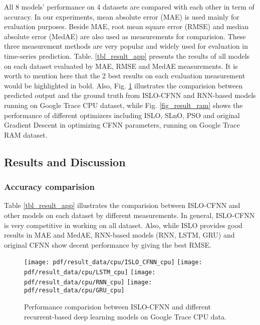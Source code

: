 \documentclass[../main.tex]{subfiles}
\begin{document}
	All 8 models' performance on 4 datasets are compared with each other in term of accuracy. In our experiments, mean absolute error (MAE) is used mainly for evaluation purposes. Beside MAE, root mean square error (RMSE) and median absolute error	(MedAE) are also used as measurements for comparision. These three measurement methods are very popular and widely used for evaluation in time-series prediction. Table. \ref{tbl_result_app} presents the results of all models on each dataset evaluated by MAE, RMSE and MedAE measurements. It is worth to mention here that the 2 best results on each evaluation measurement would be highlighted in bold. Also, Fig. \ref{fig_result_cpu_islo_rnn} illustrates the comparision between predicted output and the ground truth from ISLO-CFNN and RNN-based models running on Google Trace CPU dataset, while Fig. \ref{fig_result_ram} shows the performance of different optimizers including ISLO, SLnO, PSO and original Gradient Descent in optimizing CFNN parameters, running on Google Trace RAM dataset.



\subsection{Results and Discussion}  
\label{Results_app}
\subsubsection{Accuracy comparision}
	Table \ref{tbl_result_app} illustrates the comparision between ISLO-CFNN and other models on each dataset by different measurements. In general, ISLO-CFNN is very competitive in working on all dataset. Also, while ISLO provides good results in MAE and MedAE, RNN-based models (RNN, LSTM, GRU) and original CFNN show decent performance by giving the best RMSE.
	
\begin{figure}[!ht] 
   \centering
   	\texttt{[image: pdf/result\_data/cpu/ISLO\_CFNN\_cpu]}
  	 \texttt{[image: pdf/result\_data/cpu/LSTM\_cpu]}
  	 \texttt{[image: pdf/result\_data/cpu/RNN\_cpu]}
  	 \texttt{[image: pdf/result\_data/cpu/GRU\_cpu]}
	
  \caption{Performance comparision between ISLO-CFNN and different recurrent-based deep learning models on Google Trace CPU data.} 
  \label{fig_result_cpu_islo_rnn} 
\end{figure}
	
\end{document}
